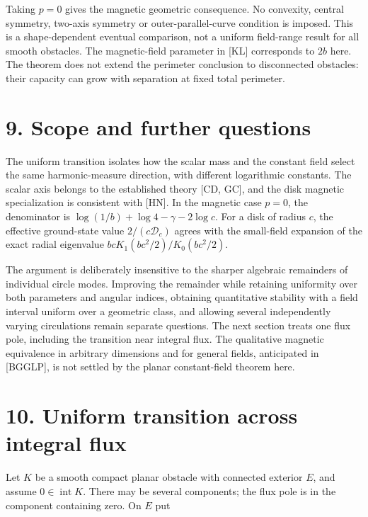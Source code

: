 \documentclass[11pt]{article}
\begin{document}
Taking \(p=0\) gives the magnetic geometric consequence. No convexity,
central symmetry, two-axis symmetry or outer-parallel-curve condition is
imposed. This is a shape-dependent eventual comparison, not a uniform
field-range result for all smooth obstacles. The magnetic-field
parameter in {[}KL{]} corresponds to \(2b\) here. The theorem does not
extend the perimeter conclusion to disconnected obstacles: their
capacity can grow with separation at fixed total perimeter.

\section{9. Scope and further
questions}\label{scope-and-further-questions}

The uniform transition isolates how the scalar mass and the constant
field select the same harmonic-measure direction, with different
logarithmic constants. The scalar axis belongs to the established theory
{[}CD, GC{]}, and the disk magnetic specialization is consistent with
{[}HN{]}. In the magnetic case \(p=0\), the denominator is
\(\log(1/b)+\log4-\gamma-2\log c\). For a disk of radius \(c\), the
effective ground-state value \(2/(c\mathcal D_c)\) agrees with the
small-field expansion of the exact radial eigenvalue
\(bcK_1(bc^2/2)/K_0(bc^2/2)\).

The argument is deliberately insensitive to the sharper algebraic
remainders of individual circle modes. Improving the remainder while
retaining uniformity over both parameters and angular indices, obtaining
quantitative stability with a field interval uniform over a geometric
class, and allowing several independently varying circulations remain
separate questions. The next section treats one flux pole, including the
transition near integral flux. The qualitative magnetic equivalence in
arbitrary dimensions and for general fields, anticipated in {[}BGGLP{]},
is not settled by the planar constant-field theorem here.

\section{10. Uniform transition across integral
flux}\label{uniform-transition-across-integral-flux}

Let \(K\) be a smooth compact planar obstacle with connected exterior
\(E\), and assume \(0\in\operatorname{int}K\). There may be several
components; the flux pole is in the component containing zero. On \(E\)
put
\end{document}
